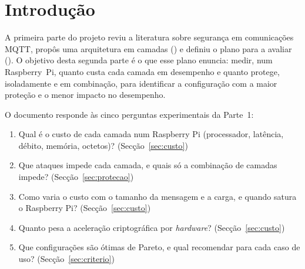\section{Introdução}
\label{sec:introducao}

 A primeira parte do projeto reviu a literatura sobre
segurança em comunicações MQTT, propôs uma arquitetura em camadas () e definiu o plano para a
avaliar ().  O objetivo desta segunda parte é o que esse plano
enuncia: medir, num Raspberry~Pi, quanto custa cada camada em desempenho e quanto
protege, isoladamente e em combinação, para identificar a configuração com a maior
proteção e o menor impacto no desempenho.

O documento responde às cinco perguntas experimentais da Parte~1:

\begin{enumerate}[label=\textbf{QP\arabic*.}, leftmargin=*]
  \item Qual é o custo de cada camada num Raspberry Pi (processador, latência,
    débito, memória, octetos)? (Secção~\ref{sec:custo})
  \item Que ataques impede cada camada, e quais só a combinação de camadas impede?
    (Secção~\ref{sec:protecao})
  \item Como varia o custo com o tamanho da mensagem e a carga, e quando satura o
    Raspberry Pi? (Secção~\ref{sec:custo})
  \item Quanto pesa a aceleração criptográfica por \emph{hardware}?
    (Secção~\ref{sec:custo})
  \item Que configurações são ótimas de Pareto, e qual recomendar para cada caso de
    uso? (Secção~\ref{sec:criterio})
\end{enumerate}

